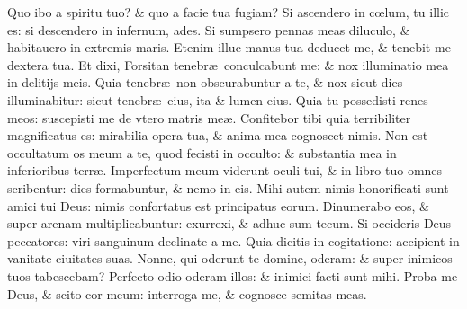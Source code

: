 \documentclass[a5paper,10pt]{book}
\def\ae{æ}
\def\oe{œ}
\begin{document}
\begin{multicols*}{2}
\newline \color{red} Q\color{black}uo ibo a spiritu tuo? \& quo a facie tua fugiam?
\newline \color{red} S\color{black}i ascendero in c\oe lum, tu illic es: si descendero in infernum, ades.
\newline \color{red} S\color{black}i sumpsero pennas meas diluculo, \& habitauero in extremis maris.
\newline \color{red} E\color{black}tenim illuc manus tua deducet me, \& tenebit me dextera tua.
\newline \color{red} E\color{black}t dixi, Forsitan tenebr\ae \ conculcabunt me: \& nox illuminatio mea in delitijs meis.%
\newline \color{red} Q\color{black}uia tenebr\ae \ non obscurabuntur a te, \& nox sicut dies illuminabitur: sicut tenebr\ae \ eius, ita \& lumen eius.
\newline \color{red} Q\color{black}uia tu possedisti renes meos: suscepisti me de vtero matris me\ae .
\newline \color{red} C\color{black}onfitebor tibi quia terribiliter magnificatus es: mirabilia opera tua, \& anima mea cognoscet nimis.%
\newline \color{red} N\color{black}on est occultatum os meum a te, quod fecisti in occulto: \& substantia mea in inferioribus terr\ae .
\newline \color{red} I\color{black}mperfectum meum viderunt oculi tui, \& in libro tuo omnes scribentur: dies formabuntur, \& nemo in eis.
\newline \color{red} M\color{black}ihi autem nimis honorificati sunt amici tui Deus: nimis confortatus est principatus eorum.
\newline \color{red} D\color{black}inumerabo eos, \& super arenam multiplicabuntur: exurrexi, \& adhuc sum tecum.
\newline \color{red} S\color{black}i occideris Deus peccatores: viri sanguinum declinate a me.
\newline \color{red} Q\color{black}uia dicitis in cogitatione: accipient in vanitate ciuitates suas.%
\newline \color{red} N\color{black}onne, qui oderunt te domine, oderam: \& super inimicos tuos tabescebam?
\newline \color{red} P\color{black}erfecto odio oderam illos: \& inimici facti sunt mihi.
\newline \color{red} P\color{black}roba me Deus, \& scito cor meum: interroga me, \& cognosce semitas meas.

\end{multicols*}
\end{document}
